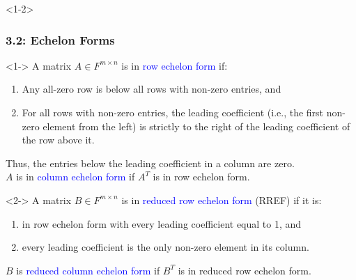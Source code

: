 \documentclass[10pt,english,aspectratio=169]{beamer}
\begin{document}

\begin{frame}<1-2> \frametitle{3.2: Echelon Forms}

\begin{definition}<1->
A matrix $A \in F^{m\times n}$ is in \textcolor{blue}{row echelon form} if:
\begin{enumerate}
\item Any all-zero row is below all rows with non-zero entries, and
\item For all rows with non-zero entries, the leading coefficient (i.e., the first non-zero element from the left) is strictly to the right of the leading coefficient of the row above it.
\end{enumerate}
Thus, the entries below the leading coefficient in a column are zero. \\
$A$ is in \textcolor{blue}{column echelon form} if $A^T$ is in row echelon form.
\end{definition}

\begin{definition}<2->
A matrix $B \in F^{m\times n}$ is in \textcolor{blue}{reduced row echelon form} (RREF) if it is:
\begin{enumerate}
\item in row echelon form with every leading coefficient equal to 1, and
\item every leading coefficient is the only non-zero element in its column.
\end{enumerate}
$B$ is \textcolor{blue}{reduced column echelon form} if $B^T$ is in reduced row echelon form.
\end{definition}





\end{frame}
\end{document}
